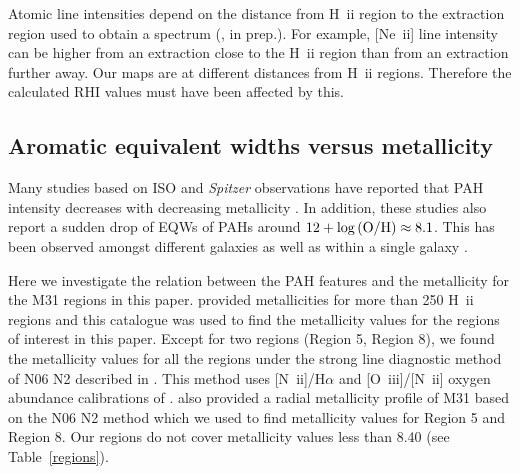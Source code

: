 %

Atomic line intensities depend on the distance from H~{\sc ii} region to the extraction region used to obtain a spectrum (\citealt{Dave2014}, in prep.). 
For example, [Ne~{\sc ii}]  line intensity can be higher from an extraction close to the H~{\sc ii} region than from an extraction further away. 
Our maps are at different distances from H~{\sc ii} regions. Therefore the calculated RHI values must have been affected by this.

\subsection{Aromatic equivalent widths versus metallicity}
\label{sect:eqw_met}
Many studies based on ISO and {\em Spitzer} observations have reported that PAH intensity decreases with decreasing metallicity \citep{Calzetti:2010fk}. 
In addition, these studies also report a sudden drop of EQWs of PAHs around $12+\log{\rm (O/H)} \approx 8.1$. 
This has been observed amongst different galaxies \citep{Engelbracht_2008} as well as within a single galaxy \citep{Gordon:2008lr}. 

%
Here we investigate the relation between the PAH features and the metallicity for the M31 regions in this paper. 
\citet{Sanders_2011} provided metallicities for more than 250 H~{\sc ii} regions and this catalogue was used to find the metallicity values for 
the regions of interest in this paper. Except for two regions (Region 5, Region 8), we found the metallicity values for all the regions under the 
strong line diagnostic method of N06 N2 described in \citet{Sanders_2011}. This method uses  [N~{\sc ii}]/H$\alpha$ and  [O~{\sc iii}]/[N~{\sc ii}] 
oxygen abundance calibrations of \citealt{Nagao2006}. \citet{Sanders_2011} also provided a radial metallicity profile of M31 based on the N06 
N2 method which we used to find metallicity values for Region 5 and Region 8. Our regions do not cover metallicity values less than 8.40 (see Table~\ref{regions}).


